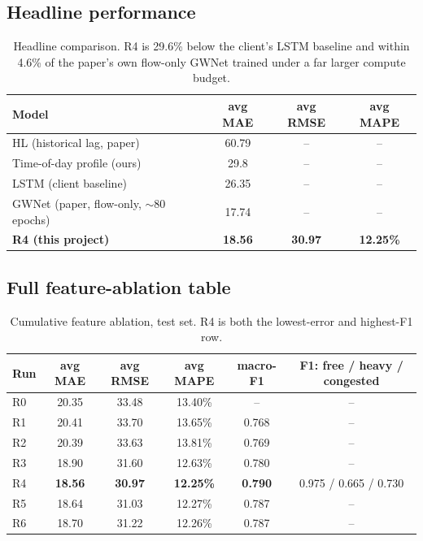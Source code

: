 \documentclass[11pt]{article}
\begin{document}
\subsection{Headline performance}

\begin{table}[htbp]
\centering
\begin{tabular}{@{}lccc@{}}
\toprule
\textbf{Model} & \textbf{avg MAE} & \textbf{avg RMSE} & \textbf{avg MAPE} \\
\midrule
HL (historical lag, paper) & 60.79 & -- & -- \\
Time-of-day profile (ours) & 29.8 & -- & -- \\
LSTM (client baseline) & 26.35 & -- & -- \\
GWNet (paper, flow-only, $\sim$80 epochs) & 17.74 & -- & -- \\
\rowcolor{accentfill}\textbf{R4 (this project)} & \textbf{18.56} & \textbf{30.97} & \textbf{12.25\%} \\
\bottomrule
\end{tabular}
\caption{Headline comparison. R4 is 29.6\% below the client's LSTM baseline and within 4.6\% of the
paper's own flow-only GWNet trained under a far larger compute budget.}
\end{table}

\subsection{Full feature-ablation table}

\begin{table}[htbp]
\centering
\small
\begin{tabular}{@{}lccccc@{}}
\toprule
\textbf{Run} & \textbf{avg MAE} & \textbf{avg RMSE} & \textbf{avg MAPE} & \textbf{macro-F1} & \textbf{F1: free / heavy / congested} \\
\midrule
R0 & 20.35 & 33.48 & 13.40\% & -- & -- \\
R1 & 20.41 & 33.70 & 13.65\% & 0.768 & -- \\
R2 & 20.39 & 33.63 & 13.81\% & 0.769 & -- \\
R3 & 18.90 & 31.60 & 12.63\% & 0.780 & -- \\
\rowcolor{accentfill} R4 & \textbf{18.56} & \textbf{30.97} & \textbf{12.25\%} & \textbf{0.790} & 0.975 / 0.665 / 0.730 \\
R5 & 18.64 & 31.03 & 12.27\% & 0.787 & -- \\
R6 & 18.70 & 31.22 & 12.26\% & 0.787 & -- \\
\bottomrule
\end{tabular}
\caption{Cumulative feature ablation, test set. R4 is both the lowest-error and highest-F1 row.}
\end{table}
\end{document}

